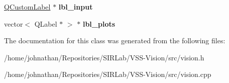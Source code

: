 \begin{DoxyCompactItemize}
\item 
\hyperlink{classQCustomLabel}{Q\+Custom\+Label} $\ast$ {\bfseries lbl\+\_\+input}\hypertarget{classvision_ae925689fd0bd2eb2fcf2159e2f7b251e}{}\label{classvision_ae925689fd0bd2eb2fcf2159e2f7b251e}

\item 
vector$<$ Q\+Label $\ast$ $>$ $\ast$ {\bfseries lbl\+\_\+plots}\hypertarget{classvision_a4ec174995015376fcc9c15add83ed422}{}\label{classvision_a4ec174995015376fcc9c15add83ed422}

\end{DoxyCompactItemize}


The documentation for this class was generated from the following files\+:\begin{DoxyCompactItemize}
\item 
/home/johnathan/\+Repositories/\+S\+I\+R\+Lab/\+V\+S\+S-\/\+Vision/src/vision.\+h\item 
/home/johnathan/\+Repositories/\+S\+I\+R\+Lab/\+V\+S\+S-\/\+Vision/src/vision.\+cpp\end{DoxyCompactItemize}
